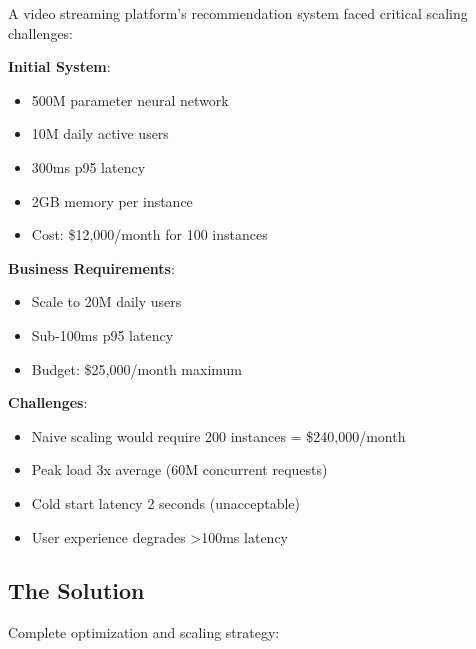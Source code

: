 A video streaming platform's recommendation system faced critical scaling challenges:

\textbf{Initial System}:
\begin{itemize}
    \item 500M parameter neural network
    \item 10M daily active users
    \item 300ms p95 latency
    \item 2GB memory per instance
    \item Cost: \$12,000/month for 100 instances
\end{itemize}

\textbf{Business Requirements}:
\begin{itemize}
    \item Scale to 20M daily users
    \item Sub-100ms p95 latency
    \item Budget: \$25,000/month maximum
\end{itemize}

\textbf{Challenges}:
\begin{itemize}
    \item Naive scaling would require 200 instances = \$240,000/month
    \item Peak load 3x average (60M concurrent requests)
    \item Cold start latency 2 seconds (unacceptable)
    \item User experience degrades >100ms latency
\end{itemize}

\subsection{The Solution}

Complete optimization and scaling strategy:

